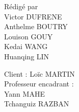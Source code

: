 {

\begin{center}
	\begin{minipage}{0.4\textwidth}
		\begin{flushleft} \large
        	\noindent Rédigé par\\ %
			Victor DUFRENE \\
			Anthelme BOUTRY\\
			Louison GOUY\\
			Kedai WANG\\
			Huanqing LIN
		\end{flushleft}
	\end{minipage}
	\begin{minipage}{0.4\textwidth}
		\begin{flushright}\large
			Client : Loïc MARTIN\\
			Professeur encadrant : \\Yann MAHE\\ Tchanguiz RAZBAN\\
						
		\end{flushright}
	\end{minipage}
\end{center}
}